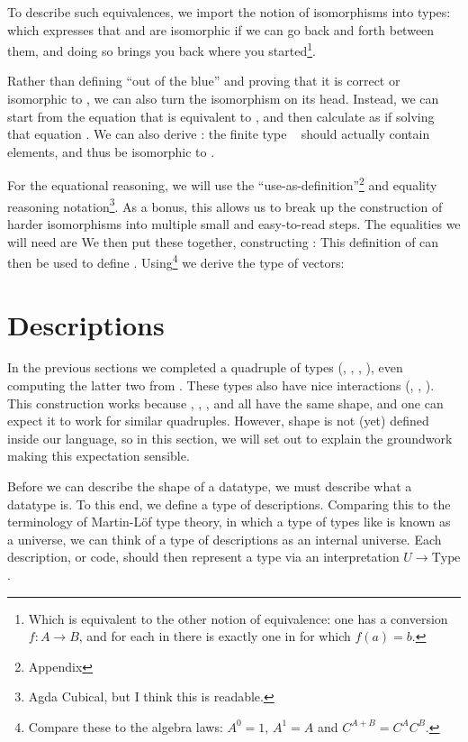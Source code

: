 To describe such equivalences, we import the notion of isomorphisms into types:
which expresses that  and  are isomorphic if we can go back and forth between them, and doing so brings you back where you started\footnote{Which is equivalent to the other notion of equivalence: one has a conversion $f : A \to B$, and for each  in  there is exactly one  in  for which $f(a) = b$.}.

Rather than defining  ``out of the blue'' and proving that it is correct or isomorphic to , we can also turn the isomorphism on its head. Instead, we can start from the equation that  is equivalent to , and then calculate  as if solving that equation \cite{calcdata}. We can also derive : the finite type \  should actually contain  elements, and thus be isomorphic to .

For the equational reasoning, we will use the ``use-as-definition''\footnote{Appendix} and equality reasoning notation\footnote{Agda Cubical, but I think this is readable.}. As a bonus, this allows us to break up the construction of harder isomorphisms into multiple small and easy-to-read steps. The equalities we will need are 
We then put these together, constructing :
This definition of  can then be used to define . Using\footnote{Compare these to the algebra laws: $A^0 = 1$, $A^1 = A$ and $C^{A + B} = C^A C^B$.}
we derive the type of vectors:


\section{Descriptions}\label{sec:background-descriptions}
In the previous sections we completed a quadruple of types (\bN{}, , , ), even computing the latter two from \bN{}. These types also have nice interactions (, , ). This construction works because \bN{}, , , and  all have the same shape, and one can expect it to work for similar quadruples. However, shape is not (yet) defined inside our language, so in this section, we will set out to explain the groundwork making this expectation sensible.

Before we can describe the shape of a datatype, we must describe what a datatype is. To this end, we define a type of descriptions. Comparing this to the terminology of Martin-L{\"{o}}f type theory, in which a type of types like  is known as a universe, we can think of a type of descriptions as an internal universe. Each description, or code, should then represent a type via an interpretation $U \to \mathrm{Type}$. 

